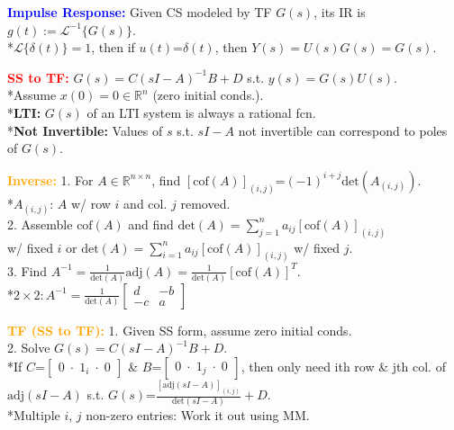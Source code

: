\documentclass[5pt]{extarticle} %
\begin{document}
\begin{paracol}{3}
{    \textcolor{blue}{\textbf{Impulse Response:}} Given CS modeled by TF $G(s)$, its IR is  
    $g(t) := \mathcal{L}^{-1} \{ G(s) \}$. \\
    *$\mathcal{L} \{\delta(t) \} = 1$, then if $u(t) \text{=} \delta(t)$, then $Y(s) = U(s) G(s) = G(s)$.

    \textcolor{red}{\textbf{SS to TF:}} $G(s) = C (sI - A)^{-1} B + D$ s.t. $y(s) = G(s) U(s)$. \\
    *Assume $x(0) = 0 \in \mathbb{R}^n$ (zero initial conds.). \\
    *\textbf{LTI:} $G(s)$ of an LTI system is always a rational fcn. \\ 
    *\textbf{Not Invertible:} Values of $s$ s.t. $sI - A$ not invertible can correspond to poles of $G(s)$.

    \textcolor{orange}{\textbf{Inverse:}} 1. For $A \in \mathbb{R}^{n \times n}$, find $[\text{cof}(A)]_{(i,j)} \text{=} (-1)^{i+j} \text{det}(A_{(i,j)})$. \\ 
    *$A_{(i,j)}$: $A$ w/ row $i$ and col. $j$ removed. \\
    2. Assemble $\text{cof}(A)$ and find $\text{det}(A) = \sum_{j=1}^n a_{ij} [\text{cof}(A)]_{(i,j)}$ \\
    w/ fixed $i$ or $\text{det}(A) = \sum_{i=1}^n a_{ij} [\text{cof}(A)]_{(i,j)}$ w/ fixed $j$. \\
    3. Find $A^{-1} = \frac{1}{\text{det}(A)} \text{adj}(A) = \frac{1}{\text{det}(A)} [\text{cof}(A)]^T$. \\
    *$2\times2: A^{-1} = \frac{1}{\text{det}(A)} \begin{bmatrix} d & -b \\ -c & a \end{bmatrix}$

    \textcolor{orange}{\textbf{TF (SS to TF):}} 1. Given SS form, assume zero initial conds. \\
    2. Solve $G(s) = C (sI - A)^{-1} B + D$. \\
    *If $C \text{=} \begin{bmatrix} 0 \; \cdot \; 1_i \; \cdot \; 0 \end{bmatrix}$ \& $B \text{=} \begin{bmatrix} 0 \; \cdot \; 1_j \; \cdot \; 0 \end{bmatrix}$, then only need ith row \& jth col. of $\text{adj}(sI - A)$ s.t. $G(s) \text{=} \frac{[\text{adj}(sI - A)]_{(i,j)}}{\text{det}(sI - A)} + D$. \\
    *Multiple $i$, $j$ non-zero entries: Work it out using MM.

}
\end{paracol}
\end{document}
